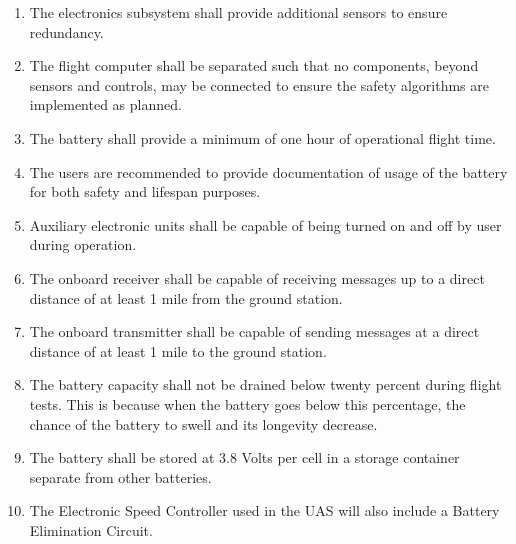 \documentclass{article} %
\begin{document}
\begin{enumerate}
\item The electronics subsystem shall provide additional sensors to ensure redundancy.\\

\item The flight computer shall be separated such that no components, beyond sensors and controls, may be connected to ensure the safety algorithms are implemented as planned.\\

\item The battery shall provide a minimum of one hour of operational flight time.\\

\item The users are recommended to provide documentation of usage of the battery for both safety and lifespan purposes.\\

\item Auxiliary electronic units shall be capable of being turned on and off by user during operation.\\

\item The onboard receiver shall be capable of receiving messages up to a direct distance of at least 1 mile from the ground station.\\

\item The onboard transmitter shall be capable of sending messages at a direct distance of at least 1 mile to the ground station.\\

\item The battery capacity shall not be drained below twenty percent during flight tests.  This is because when the battery goes below this percentage, the chance of the battery to swell and its longevity decrease. \\

\item The battery shall be stored at 3.8 Volts per cell in a storage container separate from other batteries.\\

\item The Electronic Speed Controller used in the UAS will also include a Battery Elimination Circuit.\\ 

\end{enumerate}
\end{document}
